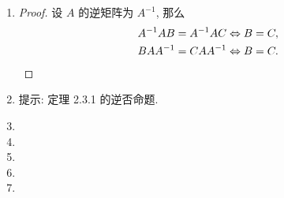 \documentclass[a4paper, 11pt]{ctexart}
\begin{document}
\begin{enumerate}
        \begin{proof}
            \[
                (A^k)^{-1} = \underbrace{AA \cdots A}_{k\ \text{项}} = \underbrace{A^{-1}A^{-1}\cdots A^{-1}}_{k\ \text{项}} = (A^{-1})^k. \qedhere   
            \]
        \end{proof}
    \item %
        \begin{proof}
            设 $A$ 的逆矩阵为 $A^{-1}$, 那么
            \begin{align*}
                A^{-1}AB = A^{-1}AC &\Leftrightarrow B = C, \\
                BAA^{-1} = CAA^{-1} &\Leftrightarrow B = C. \qedhere
            \end{align*}
        \end{proof}
    \item %
        提示: 定理 2.3.1 的逆否命题.
    \item %
    \item %
    \item %
    \item %
    \item %
\end{enumerate}
\end{document}
